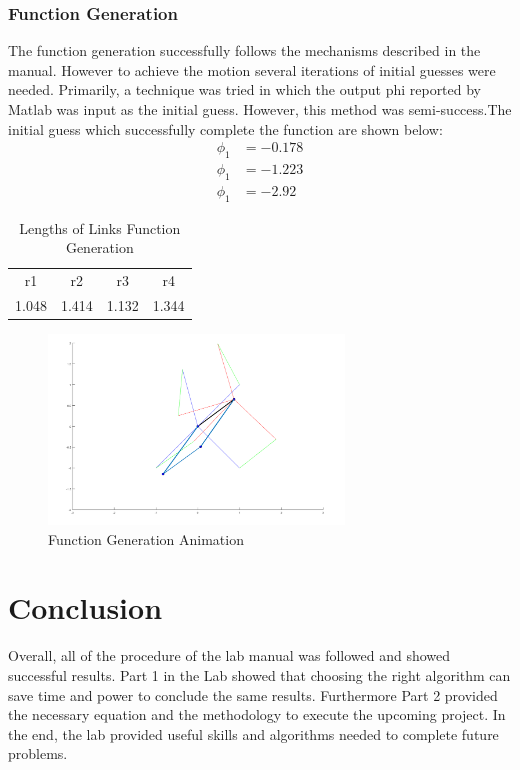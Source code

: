 \documentclass[12pt]{article}
\begin{document}
\subsubsection{Function Generation}
The function generation successfully follows the mechanisms described in the manual. However to achieve the motion several iterations of initial guesses were needed. Primarily, a technique was tried in which the output phi reported by Matlab was input as the initial guess. However, this method was semi-success.The initial guess which successfully complete the function are shown below:
\begin{align}
    \phi_1&=-0.178\nonumber\\
    \phi_1&=-1.223\nonumber\\
    \phi_1&=-2.92\nonumber
\end{align}
\begin{table}[H]
  \centering
  \caption{Lengths of Links Function Generation}
    \begin{tabular}{cccc}
    r1    & r2    & r3    & r4 \\
    1.048 & 1.414 & 1.132 & 1.344 \\
    \end{tabular}%
\end{table}%
\begin{figure}[H]
    \centering
    \includegraphics[width=0.7\textwidth]{FG_1.png}
    \caption{Function Generation Animation}
    \label{fig:FG_animation}
\end{figure}
\pagebreak
\section{Conclusion}
Overall, all of the procedure of the lab manual was followed and showed successful results. Part 1 in the Lab showed that choosing the right algorithm can save time and power to conclude the same results. Furthermore Part 2 provided the necessary equation and the methodology to execute the upcoming project. In the end, the lab provided useful skills and algorithms needed to complete future problems.
\pagebreak
\end{document}

